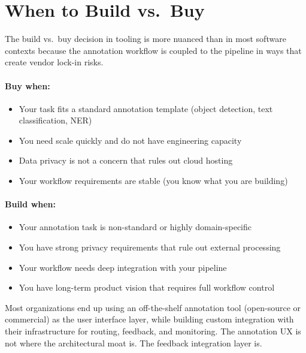 \section{When to Build vs.\ Buy}
\label{sec:ch09-build-vs-buy}

The build vs.\ buy decision in \hitl tooling is more nuanced than in most software contexts because the annotation workflow is coupled to the \ml pipeline in ways that create vendor lock-in risks.

\paragraph{Buy when:}
\begin{itemize}
  \item Your task fits a standard annotation template (object detection, text classification, NER)
  \item You need scale quickly and do not have engineering capacity
  \item Data privacy is not a concern that rules out cloud hosting
  \item Your workflow requirements are stable (you know what you are building)
\end{itemize}

\paragraph{Build when:}
\begin{itemize}
  \item Your annotation task is non-standard or highly domain-specific
  \item You have strong privacy requirements that rule out external processing
  \item Your \hitl workflow needs deep integration with your \ml pipeline
  \item You have long-term product vision that requires full workflow control
\end{itemize}

\begin{technote}
Most organizations end up using an off-the-shelf annotation tool (open-source or commercial) as the user interface layer, while building custom integration with their \ml infrastructure for routing, feedback, and monitoring. The annotation UX is not where the architectural moat is. The feedback integration layer is.
\end{technote}

